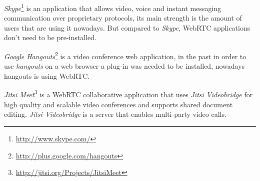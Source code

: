 \emph{Skype}\footnote{\url{http://www.skype.com/}} is an application that allows video, voice and instant messaging communication over proprietary protocols, its main strength is the amount of users that are using it nowadays. But compared to \emph{Skype}, \ac{WebRTC} applications don't need to be pre-installed.

\emph{Google Hangouts}\footnote{\url{http://plus.google.com/hangouts}} is a video conference web application, in the past in order to use \emph{hangouts} on a web browser a plug-in was needed to be installed, nowadays hangouts is using \ac{WebRTC}.

\emph{Jitsi Meet}\footnote{\url{http://jitsi.org/Projects/JitsiMeet}} is a \ac{WebRTC} collaborative application that uses \emph{Jitsi Videobridge} for high quality and scalable video conferences and supports shared document editing. \emph{Jitsi Videobridge} is a server that enables multi-party video calls.





